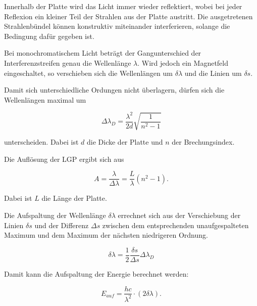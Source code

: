 Innerhalb der Platte wird das Licht immer wieder reflektiert, wobei bei jeder Reflexion ein kleiner Teil der Strahlen
aus der Platte austritt. Die ausgetretenen Strahlenbündel können konstruktiv miteinander interferieren, solange die Bedingung
dafür gegeben ist.

Bei monochromatischem Licht beträgt der Gangunterschied der Interferenzstreifen genau die Wellenlänge $\lambda$. Wird
jedoch ein Magnetfeld eingeschaltet, so verschieben sich die Wellenlängen um $\delta \lambda$ und die Linien um
$\delta s$.

Damit sich unterschiedliche Ordungen nicht überlagern, dürfen sich die Wellenlängen maximal um

\begin{equation}
  \Delta\lambda_{D} = \frac{\lambda^2}{2d} \sqrt{\frac{1}{n^2-1}}
\end{equation}

unterscheiden. Dabei ist $d$ die Dicke der Platte und $n$ der Brechungsindex.

Die Auflösung der LGP ergibt sich aus

\begin{equation}
  A = \frac{\lambda}{\Delta\lambda} = \frac{L}{\lambda} \left(n^2-1\right) .
\end{equation}

Dabei ist $L$ die Länge der Platte.

Die Aufspaltung der Wellenlänge $\delta \lambda$ errechnet sich aus der Verschiebung der Linien $\delta s$ und der
Differenz $\Delta s$ zwischen dem entsprechenden unaufgespalteten Maximum und dem Maximum der nächsten niedrigeren Ordnung.

\begin{equation}
	\delta \lambda = \frac{1}{2} \frac{\delta s}{\Delta s} \Delta\lambda_{D}
\end{equation}

Damit kann die Aufspaltung der Energie berechnet werden:

\begin{equation}
	E_{auf} = \frac{h c}{\lambda^2} \cdot (2 \delta \lambda) .
\end{equation}
